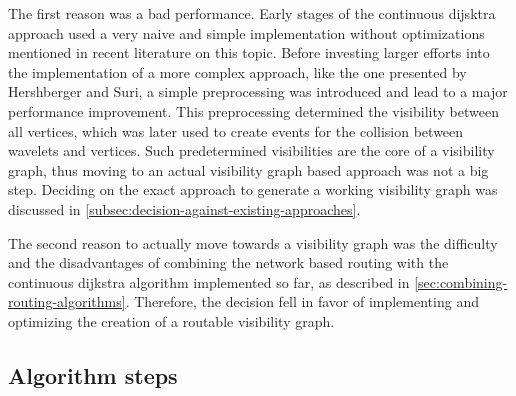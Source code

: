 		The first reason was a bad performance.
		Early stages of the continuous dijsktra approach used a very naive and simple implementation without optimizations mentioned in recent literature on this topic.
		Before investing larger efforts into the implementation of a more complex approach, like the one presented by Hershberger and Suri\cite{hershberger-suri}, a simple preprocessing was introduced and lead to a major performance improvement.
		This preprocessing determined the visibility between all vertices, which was later used to create events for the collision between wavelets and vertices.
		Such predetermined visibilities are the core of a visibility graph, thus moving to an actual visibility graph based approach was not a big step.
		Deciding on the exact approach to generate a working visibility graph was discussed in \cref{subsec:decision-against-existing-approaches}.
		
		The second reason to actually move towards a visibility graph was the difficulty and the disadvantages of combining the network based routing with the continuous dijkstra algorithm implemented so far, as described in \cref{sec:combining-routing-algorithms}.
		Therefore, the decision fell in favor of implementing and optimizing the creation of a routable visibility graph.
	
%
			
	\subsection{Algorithm steps}
	\label{subsec:algorithm-steps}
		
